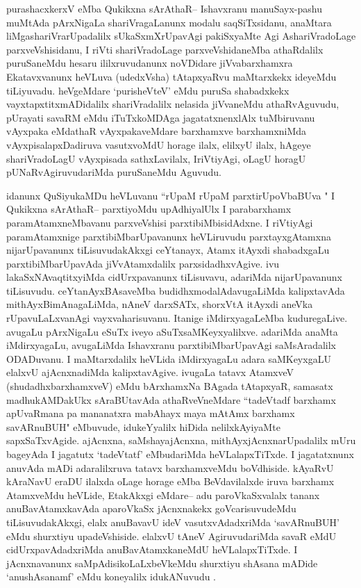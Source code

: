 \begin{artha}
purashacxkerxV eMba Qukikxna sArAthaR-- Ishavxranu manuSayx-pashu muMtAda pArxNigaLa shariVragaLanunx modalu saqSiTxsidanu, anaMtara liMgashariVrarUpadalilx sUkaSxmXrUpavAgi pakiSxyaMte Agi AshariVradoLage parxveVshisidanu, I riVti shariVradoLage parxveVshidaneMba athaRdalilx puruSaneMdu hesaru ililxruvudanunx noVDidare jiVvabarxhamxra Ekatavxvanunx heVLuva (udedxVsha) tAtapxyaRvu maMtarxkekx ideyeMdu tiLiyuvadu. heVgeMdare `purisheVteV' eMdu puruSa shabadxkekx vayxtapxtitxmADidalilx shariVradalilx nelasida jiVvaneMdu athaRvAguvudu, pUrayati savaRM eMdu iTuTxkoMDAga jagatatxnenxlAlx tuMbiruvanu vAyxpaka eMdathaR vAyxpakaveMdare barxhamxve barxhamxniMda vAyxpisalapxDadiruva vasutxvoMdU horage ilalx, elilxyU ilalx, hAgeye shariVradoLagU vAyxpisada sathxLavilalx, IriVtiyAgi, oLagU horagU pUNaRvAgiruvudariMda puruSaneMdu Aguvudu.  

idanunx  QuSiyukaMDu heVLuvanu \ndash  ``rUpaM rUpaM parxtirUpoVbaBUva  \mdash  \mdash  " I Qukikxna sArAthaR-- parxtiyoMdu upAdhiyalUlx I parabarxhamx paramAtamxneMbavanu parxveVshisi parxtibiMbisidAdxne. I riVtiyAgi paramAtamxnige parxtibiMbarUpavanunx heVLiruvudu parxtayxgAtamxna nijarUpavanunx tiLisuvudakAkxgi  ceYtanayx, Atamx itAyxdi shabadxgaLu parxtibiMbarUpavAda jiVvAtamxdalilx parxsidadhxvAgive. ivu lakaSxNAvaqtitxyiMda cidUrxpavanunx tiLisuvavu, adariMda nijarUpavanunx  tiLisuvudu. ceYtanAyxBAsaveMba budidhxmodalAdavugaLiMda kalipxtavAda mithAyxBimAnagaLiMda, nAneV darxSATx, shorxVtA itAyxdi aneVka rUpavuLaLxvanAgi vayxvaharisuvanu. Itanige iMdirxyagaLeMba kuduregaLive. avugaLu pArxNigaLu eSuTx iveyo aSuTxsaMKeyxyalilxve. adariMda anaMta iMdirxyagaLu, avugaLiMda Ishavxranu parxtibiMbarUpavAgi saMsAradalilx ODADuvanu. I maMtarxdalilx heVLida iMdirxyagaLu adara saMKeyxgaLU elalxvU ajAcnxnadiMda kalipxtavAgive. ivugaLa tatavx AtamxveV (shudadhxbarxhamxveV) eMdu bArxhamxNa BAgada tAtapxyaR, samasatx madhukAMDakUkx sAraBUtavAda athaRveVneMdare ``tadeVtadf barxhamx apUvaRmana pa mananatxra mabAhayx maya mAtAmx barxhamx savARnuBUH" eMbuvude, idukeYyalilx hiDida nelilxkAyiyaMte sapxSaTxvAgide. ajAcnxna, saMshayajAcnxna, mithAyxjAcnxnarUpadalilx mUru bageyAda I jagatutx `tadeVtatf' eMbudariMda heVLalapxTiTxde. I jagatatxnunx anuvAda mADi adaralilxruva tatavx barxhamxveMdu boVdhiside. kAyaRvU kAraNavU eraDU ilalxda oLage horage eMba BeVdavilalxde iruva barxhamx AtamxveMdu heVLide, EtakAkxgi eMdare-- adu paroVkaSxvalalx tananx anuBavAtamxkavAda aparoVkaSx jAcnxnakekx goVcarisuvudeMdu tiLisuvudakAkxgi, elalx anuBavavU ideV vasutxvAdadxriMda `savARnuBUH' eMdu shurxtiyu upadeVshiside. elalxvU tAneV AgiruvudariMda savaR eMdU cidUrxpavAdadxriMda anuBavAtamxkaneMdU heVLalapxTiTxde. I jAcnxnavanunx saMpAdisikoLaLxbeVkeMdu shurxtiyu shAsana mADide `anushAsanamf' eMdu koneyalilx idukANuvudu .
\end{artha}

